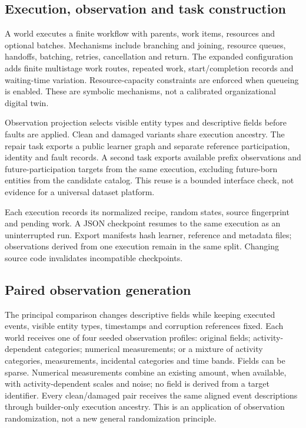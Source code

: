 \documentclass[11pt]{article}
\begin{document}
\subsection{Execution, observation and task construction}
A world executes a finite workflow with parents, work items, resources and optional batches. Mechanisms include branching and joining, resource queues, handoffs, batching, retries, cancellation and return. The expanded configuration adds finite multistage work routes, repeated work, start/completion records and waiting-time variation. Resource-capacity constraints are enforced when queueing is enabled. These are symbolic mechanisms, not a calibrated organizational digital twin.

Observation projection selects visible entity types and descriptive fields before faults are applied. Clean and damaged variants share execution ancestry. The repair task exports a public learner graph and separate reference participation, identity and fault records. A second task exports available prefix observations and future-participation targets from the same execution, excluding future-born entities from the candidate catalog. This reuse is a bounded interface check, not evidence for a universal dataset platform.

Each execution records its normalized recipe, random states, source fingerprint and pending work. A JSON checkpoint resumes to the same execution as an uninterrupted run. Export manifests hash learner, reference and metadata files; observations derived from one execution remain in the same split. Changing source code invalidates incompatible checkpoints.

\subsection{Paired observation generation}
The principal comparison changes descriptive fields while keeping executed events, visible entity types, timestamps and corruption references fixed. Each world receives one of four seeded observation profiles: original fields; activity-dependent categories; numerical measurements; or a mixture of activity categories, measurements, incidental categories and time bands. Fields can be sparse. Numerical measurements combine an existing amount, when available, with activity-dependent scales and noise; no field is derived from a target identifier. Every clean/damaged pair receives the same aligned event descriptions through builder-only execution ancestry. This is an application of observation randomization, not a new general randomization principle.
\end{document}
